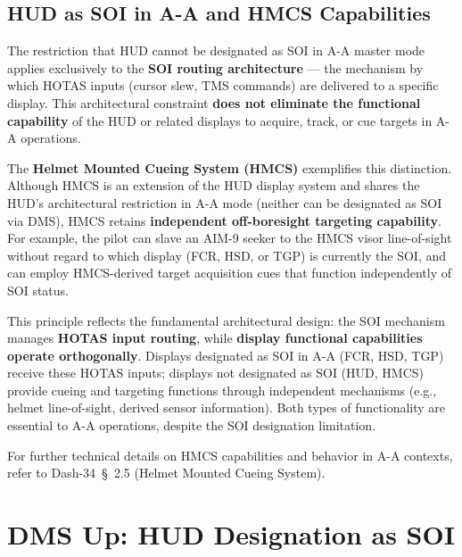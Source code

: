 \documentclass[11pt, a4paper, twoside]{report}
\providecommand{\dashref}[1]{Dash-34~\S~#1}
\begin{document}
\subsection{HUD as SOI in A-A and HMCS Capabilities}
\label{sec:C4-S1-S3}

The restriction that HUD cannot be designated as SOI in A-A master mode applies exclusively to the \textbf{SOI routing architecture} — the mechanism by which HOTAS inputs (cursor slew, TMS commands) are delivered to a specific display. This architectural constraint \textbf{does not eliminate the functional capability} of the HUD or related displays to acquire, track, or cue targets in A-A operations.

The \textbf{Helmet Mounted Cueing System (HMCS)} exemplifies this distinction. Although HMCS is an extension of the HUD display system and shares the HUD's architectural restriction in A-A mode (neither can be designated as SOI via DMS), HMCS retains \textbf{independent off-boresight targeting capability}. For example, the pilot can slave an AIM-9 seeker to the HMCS visor line-of-sight without regard to which display (FCR, HSD, or TGP) is currently the SOI, and can employ HMCS-derived target acquisition cues that function independently of SOI status.

This principle reflects the fundamental architectural design: the SOI mechanism manages \textbf{HOTAS input routing}, while \textbf{display functional capabilities operate orthogonally}. Displays designated as SOI in A-A (FCR, HSD, TGP) receive these HOTAS inputs; displays not designated as SOI (HUD, HMCS) provide cueing and targeting functions through independent mechanisms (e.g., helmet line-of-sight, derived sensor information). Both types of functionality are essential to A-A operations, despite the SOI designation limitation.

For further technical details on HMCS capabilities and behavior in A-A contexts, refer to \dashref{2.5} (Helmet Mounted Cueing System).

\section{DMS Up: HUD Designation as SOI}
\label{sec:C4-S2}
\end{document}
